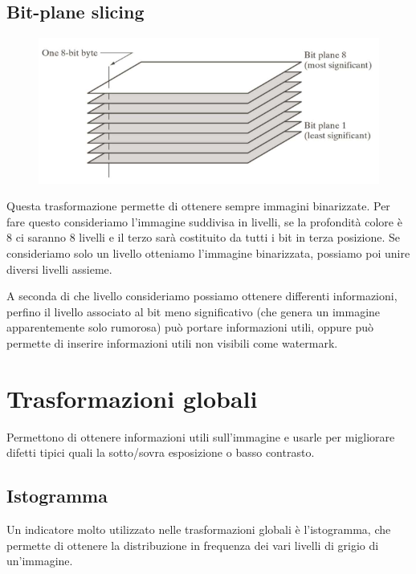 \subsection{Bit-plane slicing}
\begin{figure}
	\vspace{-.6cm}
	\centering
	\includegraphics[width=.95\linewidth]{Picture/Bit_slicing}
\end{figure}
Questa trasformazione permette di ottenere sempre immagini binarizzate. Per fare questo consideriamo l'immagine suddivisa in livelli, se la profondità colore è 8 ci saranno 8 livelli e il terzo sarà costituito da tutti i bit in terza posizione. Se consideriamo solo un livello otteniamo l'immagine binarizzata, possiamo poi unire diversi livelli assieme.

A seconda di che livello consideriamo possiamo ottenere differenti informazioni, perfino il livello associato al bit meno significativo (che genera un immagine apparentemente solo rumorosa) può portare informazioni utili, oppure può permette di inserire informazioni utili non visibili come watermark.

\section{Trasformazioni globali}
Permettono di ottenere informazioni utili sull'immagine e usarle per migliorare difetti tipici quali la sotto/sovra esposizione o basso contrasto.

\subsection{Istogramma}
Un indicatore molto utilizzato nelle trasformazioni globali è l'istogramma, che permette di ottenere la distribuzione in frequenza dei vari livelli di grigio di un'immagine.

